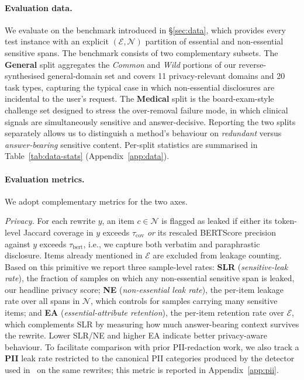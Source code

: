 \paragraph{Evaluation data.}
We evaluate on the benchmark introduced in \S\ref{sec:data}, which
provides every test instance with an explicit
$(\mathcal{E},\mathcal{N})$ partition of essential and non-essential
sensitive spans. The benchmark consists of two complementary subsets.
The \textbf{General} split aggregates the \emph{Common} and
\emph{Wild} portions of our reverse-synthesised general-domain set and
covers 11 privacy-relevant domains and 20 task types, capturing the
typical case in which non-essential disclosures are incidental to the
user's request. The \textbf{Medical} split is the board-exam-style
challenge set designed to stress the over-removal failure mode, in
which clinical signals are simultaneously sensitive and
answer-decisive. Reporting the two splits separately allows us to
distinguish a method's behaviour on \emph{redundant} versus
\emph{answer-bearing} sensitive content. Per-split statistics are
summarised in Table~\ref{tab:data-stats} (Appendix~\ref{app:data}).

\paragraph{Evaluation metrics.}
We adopt complementary metrics for the two axes.

\textit{Privacy.} For each rewrite $y$, an item $c\in\mathcal{N}$ is
flagged as leaked if either its token-level Jaccard coverage in $y$
exceeds $\tau_{\text{cov}}$ \emph{or} its rescaled BERTScore
precision~\citep{zhang2020bertscore} against $y$ exceeds
$\tau_{\text{bert}}$, i.e., we capture both verbatim and paraphrastic
disclosure. Items already mentioned in $\mathcal{E}$ are excluded
from leakage counting. Based on this primitive we report three
sample-level rates:
\textbf{SLR} (\emph{sensitive-leak rate}), the fraction of samples on
which any non-essential sensitive span is leaked, our headline
privacy score;
\textbf{NE} (\emph{non-essential leak rate}), the per-item leakage
rate over all spans in $\mathcal{N}$, which controls for samples
carrying many sensitive items; and
\textbf{EA} (\emph{essential-attribute retention}), the per-item
retention rate over $\mathcal{E}$, which complements SLR by measuring
how much answer-bearing context survives the rewrite. Lower SLR/NE
and higher EA indicate better privacy-aware behaviour. To facilitate
comparison with prior PII-redaction work, we also track a \textbf{PII}
leak rate restricted to the canonical PII categories produced by the
detector used in~\citet{prediax} on the same rewrites; this metric is
reported in Appendix~\ref{app:pii}.

